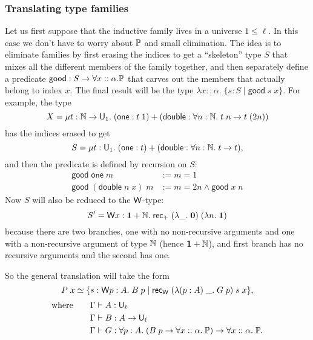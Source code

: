 \subsubsection{Translating type families}
Let us first suppose that the inductive family lives in a universe $1\le\ell$. In this case we don't have to worry about $\P$ and small elimination. The idea is to eliminate families by first erasing the indices to get a ``skeleton'' type $S$ that mixes all the different members of the family together, and then separately define a predicate $\mathsf{good}:S\to\forall x::\alpha.\P$ that carves out the members that actually belong to index $x$. The final result will be the type $\lambda x::\alpha.\;\{s:S\mid\mathsf{good}\;s\;x\}$. For example, the type
$$X=\mu t:\N\to\U_1.\;(\mathsf{one}:t\;1)+(\mathsf{double}:\forall n:\N.\;t\;n\to t\;(2n))$$
has the indices erased to get
$$S=\mu t:\U_1.\;(\mathsf{one}:t)+(\mathsf{double}:\forall n:\N.\;t\to t),$$
and then the predicate is defined by recursion on $S$:
\begin{align*}
\mathsf{good}\;\mathsf{one}\;m&:=m=1\\
\mathsf{good}\;(\mathsf{double}\;n\;x)\;m&:=m=2n\land \mathsf{good}\;x\;n
\end{align*}
Now $S$ will also be reduced to the $\W$-type:
$$S'=\W x:{\bf 1}+\N.\;\rec_+\;(\lambda\_.\;{\bf 0})\;(\lambda n.\;{\bf 1})$$
because there are two branches, one with no non-recursive arguments and one with a non-recursive argument of type $\N$ (hence ${\bf 1}+\N$), and first branch has no recursive arguments and the second has one.

So the general translation will take the form
$$P\;x\simeq\{s:\W p:A.\;B\;p\mid \rec_\W\;(\lambda (p:A)\; \_.\;G\;p)\;s\;x\},$$\vspace{-7mm}
\begin{align*}
\mbox{where}\qquad\Gamma&\vdash A:\U_\ell\\
\Gamma&\vdash B:A\to\U_\ell\\
\Gamma&\vdash G:\forall p:A.\;(B\;p\to\forall x::\alpha.\;\P)\to\forall x::\alpha.\;\P.
\end{align*}

